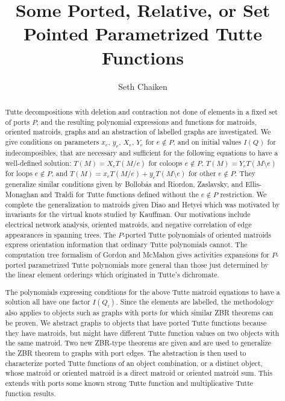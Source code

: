 \documentclass[12pt,leqno]{amsart}
\theoremstyle{remark}
\begin{document}
\title{Some Ported, Relative, or Set Pointed Parametrized Tutte Functions}

\author{Seth Chaiken}
\address{Computer Science Department\\
The University at Albany (SUNY)\\
Albany, NY 12222, U.S.A.}



\begin{abstract}
Tutte decompositions with deletion and contraction not done of elements
in a fixed set of ports $P$, and the 
resulting polynomial expressions and functions
for matroids, oriented matroids, graphs and an abstraction of
labelled graphs are investigated.
We give conditions on parameters $x_e$, $y_e$, $X_e$, $Y_e$ for $e\not\in P$,
and on initial values $I(Q)$ for indecomposibles, that are necessary and 
sufficient for the following equations to have a well-defined solution:
$T(M)=X_e T(M/e)$ for coloops $e\not\in P$, 
$T(M)=Y_e T(M\setminus e)$ for loops $e\not\in P$, and
$T(M)=x_e T(M/e) + y_e T(M\setminus e)$ for other $e\not\in P$.   They
generalize similar conditions given by Bollob\'{a}s and Riordon, Zaslavsky,
and Ellis-Monaghan and Traldi for Tutte functions defined without the
$e\not\in P$ restriction.  We complete the generalization to matroids
given Diao and Hetyei which was motivated
by invariants for the virtual knots studied by Kauffman.  
Our motivations include electrical network analysis, oriented matroids,
and negative correlation of edge appearances in spanning trees. The $P$-ported
Tutte polynomials of oriented matroids express orientation information
that ordinary Tutte polynomials cannot.
The computation tree formalism of Gordon and McMahon gives
activities expansions for $P$-ported parametrized Tutte polynomials
more general than those
just determined by the linear element orderings
which originated in Tutte's dichromate.

The polynomials expressing conditions
for the above Tutte matroid equations to have a solution
all have one factor $I(Q_i)$.  Since the elements are 
labelled, the methodology also applies
to objects such as graphs with ports
for which similar ZBR theorems can be proven.  
We abstract graphs to objects that have 
ported Tutte functions
because they have matroids, but might
have different Tutte function values
on two objects with the same matroid.
Two new ZBR-type theorems are given
and are used to generalize the ZBR
theorem to graphs with port edges.
The abstraction is then used to
characterize ported Tutte functions
of an object combination, or a distinct
object, whose matroid or oriented 
matroid is a direct matroid or
oriented matroid sum.  
This extends with ports some 
known strong Tutte 
function and multiplicative 
Tutte function results.
\end{abstract}
\end{document}
